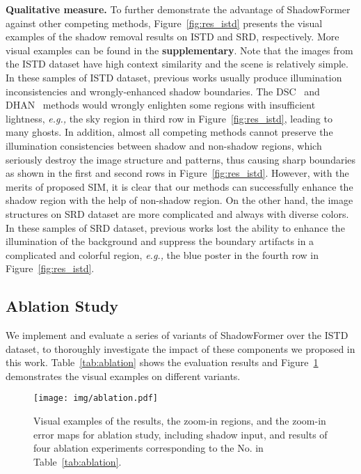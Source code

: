 \documentclass[letterpaper]{article} \usepackage{aaai23}  \usepackage{times}  \usepackage{helvet}  \usepackage{courier}  \usepackage[hyphens]{url}  \usepackage{graphicx} \urlstyle{rm} \def\UrlFont{\rm}  \usepackage{natbib}  \usepackage{caption} \frenchspacing  \setlength{\pdfpagewidth}{8.5in} \setlength{\pdfpageheight}{11in} \usepackage{algorithm}
\newcommand{\eg}{\textit{e.g., }}
\begin{document}
\noindent\textbf{Qualitative measure.}
To further demonstrate the advantage of ShadowFormer against other competing methods, 
Figure~\ref{fig:res_istd} presents the visual examples of the shadow removal results on ISTD and SRD, respectively.
More visual examples can be found in the \textbf{supplementary}.
Note that the images from the ISTD dataset have high context similarity and the scene is relatively simple.
In these samples of ISTD dataset, previous works usually produce illumination inconsistencies and wrongly-enhanced shadow boundaries.
The DSC~\cite{hu2019direction} and DHAN~\cite{cun2020towards} methods would wrongly enlighten some regions with insufficient lightness, \eg the sky region in third row in Figure~\ref{fig:res_istd}, leading to many ghosts.
In addition, almost all competing methods cannot preserve the illumination consistencies between shadow and non-shadow regions, which seriously destroy the image structure and patterns, thus causing sharp boundaries as shown in the first and second rows in Figure~\ref{fig:res_istd}.
However, with the merits of proposed SIM, it is clear that our methods can successfully enhance the shadow region with the help of non-shadow region.
On the other hand, the image structures on SRD dataset are more complicated and always with diverse colors.
In these samples of SRD dataset, previous works lost the ability to enhance the illumination of the background and suppress the boundary artifacts in a complicated and colorful region, \eg the blue poster in the fourth row in Figure~\ref{fig:res_istd}.


























\subsection{Ablation Study}
We implement and evaluate a series of variants of ShadowFormer over the ISTD dataset, to thoroughly investigate the impact of these components we proposed in this work.
Table~\ref{tab:ablation} shows the evaluation results and Figure~\ref{fig:ablation} demonstrates the visual examples on different variants.
\begin{figure}[!t]
\centering
\texttt{[image: img/ablation.pdf]} 
\vspace{-1mm}
\caption{Visual examples of the results, the zoom-in regions, and the zoom-in error maps for ablation study, including shadow input, and results of four ablation experiments corresponding to the No. in Table~\ref{tab:ablation}.}
\label{fig:ablation} 
\end{figure}
\end{document}
